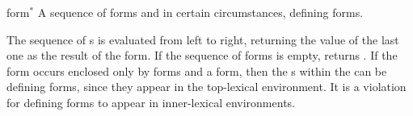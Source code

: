 \begin{optDefinition}
%
\Syntax
{}%
%
\begin{arguments}
    \item[form\/$^*$] A sequence of forms and in certain circumstances, defining
    forms.
\end{arguments}
%
\result%
The sequence of s is evaluated from left to right, returning the
value of the last one as the result of the  form.  If the
sequence of forms is empty,  returns \nil{}.
%
\remarks%
If the  form occurs enclosed only by  forms
and a  form, then the s within the
 can be defining forms, since they appear in the top-lexical
environment.  It is a violation for defining forms to appear in inner-lexical
environments.

%


\end{optDefinition}
